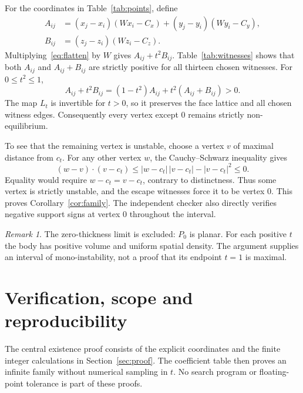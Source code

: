 \documentclass[11pt]{amsart}
\theoremstyle{remark}
\newtheorem*{remark}{Remark}
\begin{document}
For the coordinates in Table~\ref{tab:points}, define
\begin{align*}
 A_{ij}&=(x_j-x_i)(Wx_i-C_x)+(y_j-y_i)(Wy_i-C_y),\\
 B_{ij}&=(z_j-z_i)(Wz_i-C_z).
\end{align*}
Multiplying~\eqref{eq:flatten} by $W$ gives $A_{ij}+t^2B_{ij}$. Table~\ref{tab:witnesses} shows that both $A_{ij}$ and $A_{ij}+B_{ij}$ are strictly positive for all thirteen chosen witnesses. For $0\le t^2\le1$,
\[
 A_{ij}+t^2B_{ij}=(1-t^2)A_{ij}+t^2(A_{ij}+B_{ij})>0.
\]
The map $L_t$ is invertible for $t>0$, so it preserves the face lattice and all chosen witness edges. Consequently every vertex except $0$ remains strictly non-equilibrium.

To see that the remaining vertex is unstable, choose a vertex $v$ of maximal distance from $c_t$. For any other vertex $w$, the Cauchy--Schwarz inequality gives
\[
 (w-v)\cdot(v-c_t)
 \le |w-c_t|\,|v-c_t|-|v-c_t|^2\le0.
\]
Equality would require $w-c_t=v-c_t$, contrary to distinctness. Thus some vertex is strictly unstable, and the escape witnesses force it to be vertex $0$. This proves Corollary~\ref{cor:family}. The independent checker also directly verifies negative support signs at vertex $0$ throughout the interval.

\begin{remark}
The zero-thickness limit is excluded: $P_0$ is planar. For each positive $t$ the body has positive volume and uniform spatial density. The argument supplies an interval of mono-instability, not a proof that its endpoint $t=1$ is maximal.
\end{remark}

\section{Verification, scope and reproducibility}\label{sec:verification}

The central existence proof consists of the explicit coordinates and the finite integer calculations in Section~\ref{sec:proof}. The coefficient table then proves an infinite family without numerical sampling in $t$. No search program or floating-point tolerance is part of these proofs.
\end{document}
